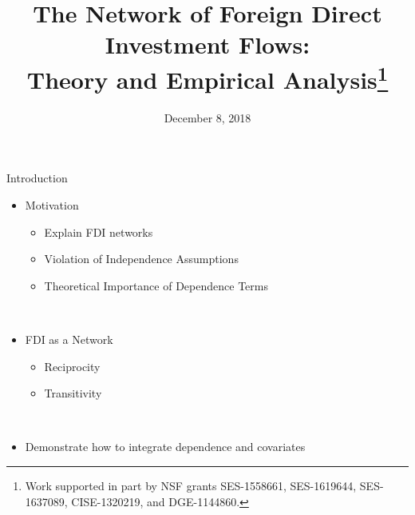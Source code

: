 \documentclass{beamer}
\title[The Network of FDI Flows]{The Network of Foreign Direct Investment Flows:\\Theory and Empirical Analysis\thanks{\scriptsize {Work supported in part by NSF grants SES-1558661, SES-1619644,
 SES-1637089, CISE-1320219, and DGE-1144860.}}}
\author[Schoeneman, Zhu, \& Desmarais]{%
  \texorpdfstring{%
    \begin{columns}
      \column{.3\linewidth}
      \centering
      John Schoeneman{\thanks{\scriptsize{Pennsylvania State University}}} \\ \scriptsize{jbs5686@psu.edu\\ PhD Candidate}
      \column{.3\linewidth}
      \centering
      Boliang Zhu{\samethanks[2]} \\ \scriptsize{bxz14@psu.edu\\ Assistant Professor}
    \end{columns}
    \vspace{12pt}
    \begin{columns}
      \column{.9\linewidth}
      \centering
      Bruce Desmarais{\samethanks[2]}\\ \scriptsize{bdesmarais@psu.edu\\ Associate Professor} \\ ~\\ Workshop Modeling Spatial and Network Interdependence in \\ International Relations, December 7-8, 2018, St. Gallen 
    \end{columns}
 }
 {Author 1, Author 2, Author 3} \vspace{-.3cm}
}
\date{December 8, 2018}
\begin{document}
\begin{frame}
  \titlepage


\end{frame}




\begin{frame}{Introduction}


\begin{itemize}
 \item{Motivation}
 \begin{itemize}
 \item{Explain FDI networks}
\item{Violation of Independence Assumptions}
\item{Theoretical Importance of Dependence Terms}
 \end{itemize} ~\\
\item{FDI as a Network}
\begin{itemize}
\item{Reciprocity}
\item{Transitivity}
 \end{itemize} ~\\

  \item{Demonstrate how to integrate dependence and covariates}
 \end{itemize}



\end{frame}
\end{document}

